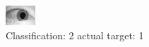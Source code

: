 \begin{figure}[h!]
\begin{center}
\includegraphics[width=0.60\columnwidth]{figures/ID1512_class_2_target_1.png}
\end{center}
\caption{ Classification: 2 actual target: 1}
\label{fig:ID1512_class_2_target_1}
\end{figure}
